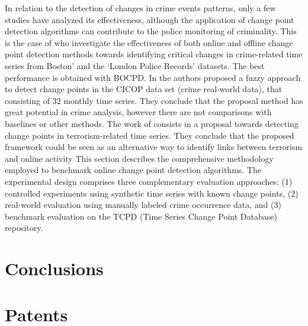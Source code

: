 \documentclass[journal,article,submit,pdftex,moreauthors]{Definitions/mdpi}
\begin{document}
In relation to the detection of changes in crime events patterns, only a few studies have analyzed its effectiveness, although the application of change point detection algorithms can contribute to the police monitoring of criminality. This is the case of \cite{konstantinou2023trend} who investigate the effectiveness of both online and offline change point detection methods towards identifying critical changes in crime-related time series from Boston’ and the ‘London Police Records’ datasets. The best performance is obtained with BOCPD. In \cite{albertetti2016change} the authors proposed a fuzzy approach to detect change points in the CICOP data set (crime real-world data), that consisting of 32 monthly time series. They conclude that the proposal method has great potential in crime analysis, however there are not comparisons with baselines or other methods.  The work of \cite{theodosiadou2021change} consists in a proposal towards detecting change points in terrorism-related time series. They conclude that the proposed framework could be seen as an alternative way to identify links between terrorism and online activity
This section describes the comprehensive methodology employed to benchmark online change point detection algorithms. The experimental design comprises three complementary evaluation approaches: (1) controlled experiments using synthetic time series with known change points, (2) real-world evaluation using manually labeled crime occurrence data, and (3) benchmark evaluation on the TCPD (Time Series Change Point Database) repository.








\section{Conclusions}



\section{Patents}
\end{document}
